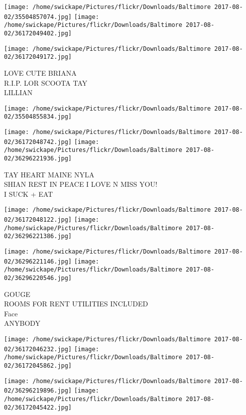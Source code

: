 \documentclass[10pt,letterpaper]{article}
\begin{document}
\texttt{[image: /home/swickape/Pictures/flickr/Downloads/Baltimore 2017-08-02/35504857074.jpg]}
\texttt{[image: /home/swickape/Pictures/flickr/Downloads/Baltimore 2017-08-02/36172049402.jpg]}

\vspace{0.25in}
\texttt{[image: /home/swickape/Pictures/flickr/Downloads/Baltimore 2017-08-02/36172049172.jpg]}

LOVE CUTE BRIANA\\
R.I.P. LOR SCOOTA TAY\\
LILLIAN\\
\pagebreak

\texttt{[image: /home/swickape/Pictures/flickr/Downloads/Baltimore 2017-08-02/35504855834.jpg]}

\vspace{0.25in}
\texttt{[image: /home/swickape/Pictures/flickr/Downloads/Baltimore 2017-08-02/36172048742.jpg]}
\texttt{[image: /home/swickape/Pictures/flickr/Downloads/Baltimore 2017-08-02/36296221936.jpg]}

TAY HEART MAINE NYLA\\
SHIAN REST IN PEACE I LOVE N MISS YOU!\\
I SUCK + EAT\\
\pagebreak

\texttt{[image: /home/swickape/Pictures/flickr/Downloads/Baltimore 2017-08-02/36172048122.jpg]}
\texttt{[image: /home/swickape/Pictures/flickr/Downloads/Baltimore 2017-08-02/36296221386.jpg]}

\texttt{[image: /home/swickape/Pictures/flickr/Downloads/Baltimore 2017-08-02/36296221146.jpg]}
\texttt{[image: /home/swickape/Pictures/flickr/Downloads/Baltimore 2017-08-02/36296220546.jpg]}

GOUGE\\
ROOMS FOR RENT UTILITIES INCLUDED\\
Face\\
ANYBODY\\
\pagebreak

\texttt{[image: /home/swickape/Pictures/flickr/Downloads/Baltimore 2017-08-02/36172046232.jpg]}
\texttt{[image: /home/swickape/Pictures/flickr/Downloads/Baltimore 2017-08-02/36172045862.jpg]}

\texttt{[image: /home/swickape/Pictures/flickr/Downloads/Baltimore 2017-08-02/36296219896.jpg]}
\texttt{[image: /home/swickape/Pictures/flickr/Downloads/Baltimore 2017-08-02/36172045422.jpg]}
\end{document}
